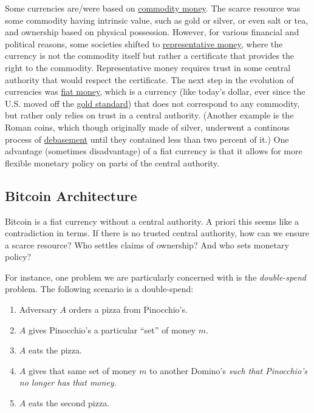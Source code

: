Some currencies are/were based on \href{https://goo.gl/K7awAW}{commodity
money}. The scarce resource was some commodity having intrinsic value,
such as gold or silver, or even salt or tea, and ownership based on
physical possession. However, for various financial and political
reasons, some societies shifted to
\href{https://goo.gl/K6c4qP}{representative money}, where the currency
is not the commodity itself but rather a certificate that provides the
right to the commodity. Representative money requires trust in some
central authority that would respect the certificate. The next step in
the evolution of currencies was
\href{https://en.wikipedia.org/wiki/Fiat_money}{fiat money}, which is a
currency (like today's dollar, ever since the U.S. moved off the
\href{https://goo.gl/SPN5BS}{gold standard}) that does not correspond to
any commodity, but rather only relies on trust in a central authority.
(Another example is the Roman coins, which though originally made of
silver, underwent a continous process of
\href{https://goo.gl/ZDkGzL}{debasement} until they contained less than
two percent of it.) One advantage (sometimes disadvantage) of a fiat
currency is that it allows for more flexible monetary policy on parts of
the central authority.

\subsection{Bitcoin Architecture}\label{7-Bitcoin-Architecture}

Bitcoin is a fiat currency without a central authority. A priori this
seems like a contradiction in terms. If there is no trusted central
authority, how can we ensure a scarce resource? Who settles claims of
ownership? And who sets monetary policy?

For instance, one problem we are particularly concerned with is the
\emph{double-spend} problem. The following scenario is a double-spend:

\begin{enumerate}
\def\labelenumi{\arabic{enumi}.}
\tightlist
\item
  Adversary \(A\) orders a pizza from Pinocchio's.
\item
  \(A\) gives Pinocchio's a particular ``set'' of money \(m\).
\item
  \(A\) eats the pizza.
\item
  \(A\) gives that same set of money \(m\) to another Domino's
  \emph{such that Pinocchio's no longer has that money}.
\item
  \(A\) eats the second pizza.
\end{enumerate}

